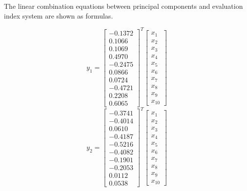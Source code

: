 \documentclass{mcmthesis}
\begin{document}
\begin{enumerate}
\begin{enumerate}
        The linear combination equations between principal components and evaluation index system are shown as formulas.

          \begin{table}[!hbpt]
               \centering
               $${ y }_{ 1 }={ \begin{bmatrix} -0.1372 \\ 0.1066 \\ 0.1069 \\ 0.4970 \\ -0.2475 \\ 0.0866 \\ 0.0724 \\ -0.4721 \\ 0.2208 \\ 0.6065 \end{bmatrix} }^{ T }\begin{bmatrix} x_{ 1 } \\ x_{ 2 } \\ x_{ 3 } \\ x_{ 4 } \\ x_{ 5 } \\ x_{ 6 } \\ x_{ 7 } \\ x_{ 8 } \\ x_{ 9 } \\ x_{ 10 } \end{bmatrix}$$
              $${ y }_{ 2 }={ \begin{bmatrix} -0.3741 \\ -0.4014 \\ 0.0610 \\ -0.4187 \\ -0.5216 \\ -0.4082 \\ -0.1901 \\ -0.2053 \\ 0.0112 \\ 0.0538 \end{bmatrix} }^{ T }\begin{bmatrix} x_{ 1 } \\ x_{ 2 } \\ x_{ 3 } \\ x_{ 4 } \\ x_{ 5 } \\ x_{ 6 } \\ x_{ 7 } \\ x_{ 8 } \\ x_{ 9 } \\ x_{ 10 } \end{bmatrix}$$

\end{table}
\end{enumerate}
\end{enumerate}
\end{document}
